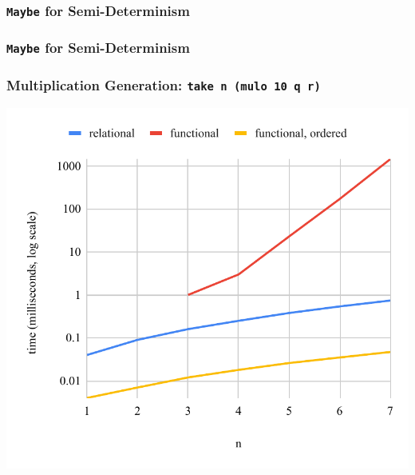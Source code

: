 \documentclass[xcolor=table]{beamer}
\begin{document}
\begin{frame}[fragile]
  \frametitle{\lstinline[basicstyle=\Large]{Maybe} for Semi-Determinism}

\end{frame}


\begin{frame}[noframenumbering]
  \frametitle{\lstinline[basicstyle=\Large]{Maybe} for Semi-Determinism}

\end{frame}

\begin{frame}[fragile]
  \frametitle{Multiplication Generation: \lstinline[basicstyle=\Large]{take n (mulo 10 q r)}}
  \begin{center}
    \includegraphics[height=0.85\textheight]{figures/muloIOO.pdf}
  \end{center}
\end{frame}
\end{document}
